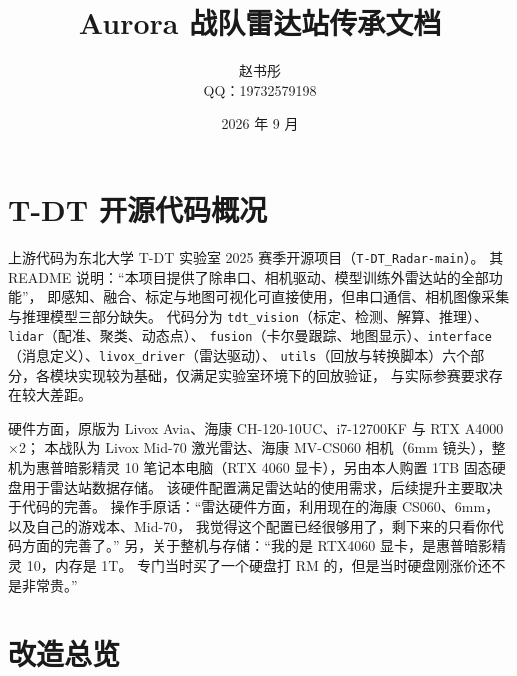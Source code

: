 \documentclass[11pt,a4paper,fontset=none]{ctexart}
\title{\heiti\textbf{Aurora 战队雷达站传承文档}}
\author{赵书彤 \\[2pt] \small QQ：19732579198}
\date{2026 年 9 月}
\newcommand{\code}[1]{\texttt{#1}}
\begin{document}
\maketitle

\tableofcontents

\section{T-DT 开源代码概况}

上游代码为东北大学 T-DT 实验室 2025 赛季开源项目（\code{T-DT\_Radar-main}）。
其 README 说明：``本项目提供了除串口、相机驱动、模型训练外雷达站的全部功能''，
即感知、融合、标定与地图可视化可直接使用，但串口通信、相机图像采集与推理模型三部分缺失。
代码分为 \code{tdt\_vision}（标定、检测、解算、推理）、\code{lidar}（配准、聚类、动态点）、
\code{fusion}（卡尔曼跟踪、地图显示）、\code{interface}（消息定义）、\code{livox\_driver}（雷达驱动）、
\code{utils}（回放与转换脚本）六个部分，各模块实现较为基础，仅满足实验室环境下的回放验证，
与实际参赛要求存在较大差距。

硬件方面，原版为 Livox Avia、海康 CH-120-10UC、i7-12700KF 与 RTX A4000$\times$2；
本战队为 Livox Mid-70 激光雷达、海康 MV-CS060 相机（6mm 镜头），整机为惠普暗影精灵 10
笔记本电脑（RTX 4060 显卡），另由本人购置 1TB 固态硬盘用于雷达站数据存储。
该硬件配置满足雷达站的使用需求，后续提升主要取决于代码的完善。
操作手原话：``雷达硬件方面，利用现在的海康 CS060、6mm，以及自己的游戏本、Mid-70，
我觉得这个配置已经很够用了，剩下来的只看你代码方面的完善了。''
另，关于整机与存储：``我的是 RTX4060 显卡，是惠普暗影精灵 10，内存是 1T。
专门当时买了一个硬盘打 RM 的，但是当时硬盘刚涨价还不是非常贵。''

\section{改造总览}
\end{document}
